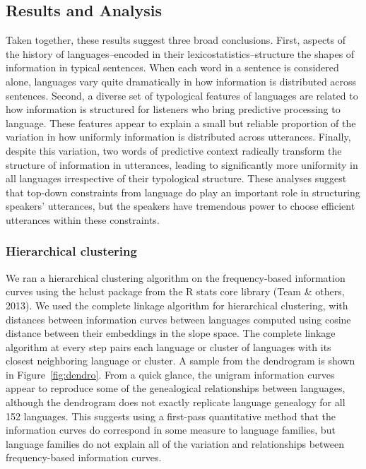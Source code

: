 \documentclass[man,floatsintext]{apa6}
\begin{document}
\hypertarget{results-and-analysis}{%
\subsection{Results and Analysis}\label{results-and-analysis}}

Taken together, these results suggest three broad conclusions. First, aspects of the history of languages--encoded in their lexicostatistics--structure the shapes of information in typical sentences. When each word in a sentence is considered alone, languages vary quite dramatically in how information is distributed across sentences. Second, a diverse set of typological features of languages are related to how information is structured for listeners who bring predictive processing to language. These features appear to explain a small but reliable proportion of the variation in how uniformly information is distributed across utterances. Finally, despite this variation, two words of predictive context radically transform the structure of information in utterances, leading to significantly more uniformity in all languages irrespective of their typological structure. These analyses suggest that top-down constraints from language do play an important role in structuring speakers' utterances, but the speakers have tremendous power to choose efficient utterances within these constraints.

\hypertarget{hierarchical-clustering}{%
\subsubsection{Hierarchical clustering}\label{hierarchical-clustering}}

We ran a hierarchical clustering algorithm on the frequency-based information curves using the hclust package from the R stats core library (Team \& others, 2013). We used the complete linkage algorithm for hierarchical clustering, with distances between information curves between languages computed using cosine distance between their embeddings in the slope space. The complete linkage algorithm at every step pairs each language or cluster of languages with its closest neighboring language or cluster. A sample from the dendrogram is shown in Figure~\ref{fig:dendro}. From a quick glance, the unigram information curves appear to reproduce some of the genealogical relationships between languages, although the dendrogram does not exactly replicate language genealogy for all 152 languages. This suggests using a first-pass quantitative method that the information curves do correspond in some measure to language families, but language families do not explain all of the variation and relationships between frequency-based information curves.
\end{document}

